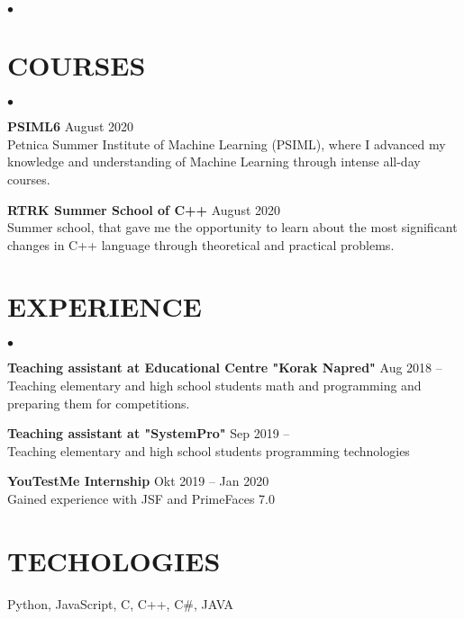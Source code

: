 \documentclass[margin,center]{res}
\newenvironment{list2}{
  \begin{list}{$\bullet$}{%
      \setlength{\itemsep}{0in}
      \setlength{\parsep}{0in} \setlength{\parskip}{0in}
      \setlength{\topsep}{0in} \setlength{\partopsep}{0in}
      \setlength{\leftmargin}{0.2in}}}{\end{list}}
\begin{document}
\begin{resume}
\begin{list2}
\end{list2}

\section{COURSES}
\begin{list2}
  \item {\bf PSIML6} \hfill August 2020\\
    Petnica Summer Institute of Machine Learning (PSIML), where I
    advanced my knowledge and understanding of Machine Learning
    through intense all-day courses.

  \item {\bf RTRK Summer School of C++} \hfill August 2020\\
    Summer school, that gave me the opportunity to learn about the
    most significant changes in C++ language through theoretical and
    practical problems.

\end{list2}


\section{EXPERIENCE} 
\begin{list2}
  \item{\bf Teaching assistant at Educational Centre "Korak Napred"}  \hfill Aug 2018 --\\
    Teaching elementary and high school students math and programming and preparing them for competitions.
  \item{\bf Teaching assistant at "SystemPro"}  \hfill Sep 2019 --\\
    Teaching elementary and high school students programming technologies 
  \item{\bf YouTestMe Internship}  \hfill Okt 2019 -- Jan 2020\\
    Gained experience with JSF and PrimeFaces 7.0
\end{list2}

\section{TECHOLOGIES}  
Python, JavaScript, C, C++, C\#, JAVA

\end{resume}
\end{document}
